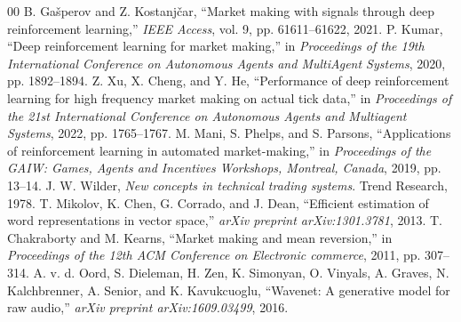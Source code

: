 \documentclass[conference]{IEEEtran}
\begin{document}
\begin{thebibliography}{00}
 B. Gašperov and Z. Kostanjčar, ``Market making with signals through deep reinforcement learning,'' \textit{IEEE Access}, vol. 9, pp. 61611--61622, 2021.
 P. Kumar, ``Deep reinforcement learning for market making,'' in \textit{Proceedings of the 19th International Conference on Autonomous Agents and MultiAgent Systems}, 2020, pp. 1892--1894.
 Z. Xu, X. Cheng, and Y. He, ``Performance of deep reinforcement learning for high frequency market making on actual tick data,'' in \textit{Proceedings of the 21st International Conference on Autonomous Agents and Multiagent Systems}, 2022, pp. 1765--1767.
 M. Mani, S. Phelps, and S. Parsons, ``Applications of reinforcement learning in automated market-making,'' in \textit{Proceedings of the GAIW: Games, Agents and Incentives Workshops, Montreal, Canada}, 2019, pp. 13--14.
 J. W. Wilder, \textit{New concepts in technical trading systems}. Trend Research, 1978.
 T. Mikolov, K. Chen, G. Corrado, and J. Dean, ``Efficient estimation of word representations in vector space,'' \textit{arXiv preprint arXiv:1301.3781}, 2013.
 T. Chakraborty and M. Kearns, ``Market making and mean reversion,'' in \textit{Proceedings of the 12th ACM Conference on Electronic commerce}, 2011, pp. 307--314.
 A. v. d. Oord, S. Dieleman, H. Zen, K. Simonyan, O. Vinyals, A. Graves, N. Kalchbrenner, A. Senior, and K. Kavukcuoglu, ``Wavenet: A generative model for raw audio,'' \textit{arXiv preprint arXiv:1609.03499}, 2016.
\end{thebibliography}
\end{document}
